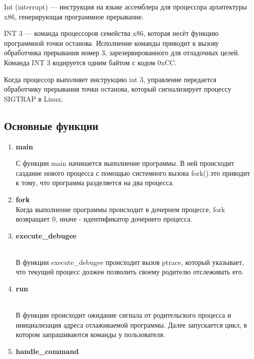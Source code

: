 \documentclass[a4paper,14pt,oneside]{extreport}  %
\begin{document}
Int (interrupt) — инструкция на языке ассемблера для процессора архитектуры x86, генерирующая программное прерывание.

INT 3 — команда процессоров семейства x86, которая несёт функцию программной точки останова. Исполнение команды приводит к вызову обработчика прерывания номер 3, зарезервированного для отладочных целей. Команда INT 3 кодируется одним байтом с кодом 0xCC.

Когда процессор выполняет инструкцию int 3, управление передается обработчику прерывания точки останова, который сигнализирует процессу SIGTRAP в Linux.
\subsection{Основные функции}
	\begin{enumerate}
	\item  {\bf main} 
	\begin{figure}[h!]
		\center{\texttt{[image: 1]}}
		\caption{}
	\end{figure}
	\newpage
	С функции main начинается выполнение программы. В ней происходит саздание нового процесса с помощью системного вызова fork().это приводит к тому, что программа разделяется на два процесса. 
	\item {\bf fork}\\
	
	Когда выполнение программы происходит в дочернем процессе, fork возвращает 0, иначе - идентификатор дочернего процесса. 
	\item  {\bf execute\_debugee}
	\begin{figure}[h!]
		\center{\texttt{[image: 2]}}
		\caption{}
	\end{figure}
	\\
	В функции execute\_debugee происходит вызов ptrace, который указывает, что текущий процесс должен позволить своему родителю отслеживать его. 
	\item  {\bf run} 
	\begin{figure}[h!]
		\center{\texttt{[image: 3]}}
		\caption{}
	\end{figure}
	\\
	В функции происходит ожидание сигнала от родительского процесса и инициализация адреса отлаживаемой программы. Далее запускается цикл, в котором запрашиваются команды у пользователя.
	\item {\bf handle\_command} \\
	

\end{enumerate}
\end{document}
